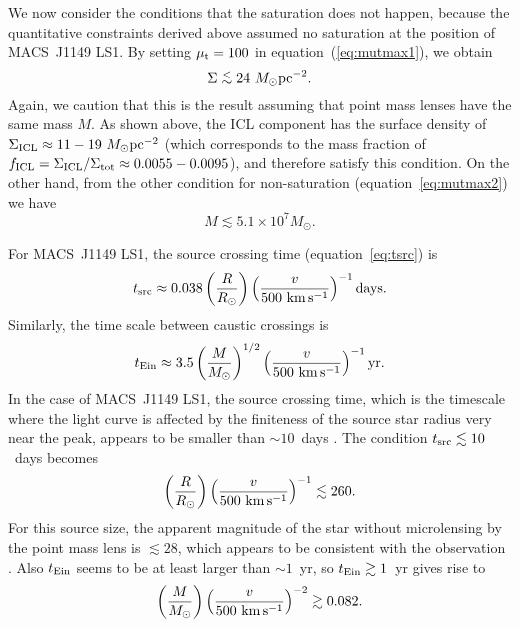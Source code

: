 \documentclass[showpacs,twocolumn,preprintnumbers,amsmath,amssymb,superscriptaddress,nofootinbib]{revtex4}
\newcommand{\simlt}{\lower.5ex\hbox{$\; \buildrel < \over \sim \;$}}
\begin{document}
We now consider the conditions that the saturation does not
happen, because the quantitative constraints derived above assumed
no saturation at the position of MACS~J1149 LS1. By setting $\mu_{\rm
  t}=100$ in equation~(\ref{eq:mutmax1}), we obtain
\begin{equation}
\Sigma\simlt 24~M_\odot{\rm pc}^{-2}.
\label{eq:const3}
\end{equation}
Again, we caution that this is the result assuming that point mass
lenses have the same mass $M$. As shown above, the ICL component has
the surface density of 
$\Sigma_{\rm ICL}\approx 11-19~M_\odot{\rm pc}^{-2}$ (which corresponds to
the mass fraction of $f_{\rm ICL}=\Sigma_{\rm ICL}/\Sigma_{\rm
  tot}\approx 0.0055-0.0095$), and therefore satisfy this
condition. On the other hand, from the other condition for
non-saturation (equation~\ref{eq:mutmax2}) we have
\begin{equation}
M\lesssim 5.1\times 10^7M_\odot.
\label{eq:const4}
\end{equation}

For MACS~J1149 LS1, the source crossing time (equation~\ref{eq:tsrc}) is
\begin{equation}
  t_{\rm src}\approx 0.038
  \left(\frac{R}{R_\odot}\right) \left(\frac{v}{500~{\rm
  km\,s^{-1}}}\right)^{-1}{\rm days}.
\end{equation}
Similarly, the time scale between caustic crossings is
\begin{equation}
  t_{\rm Ein}\approx
3.5\left(\frac{M}{M_\odot}\right)^{1/2}
\left(\frac{v}{500~{\rm km\,s^{-1}}}\right)^{-1} {\rm yr}.
\label{eq:tein2}
\end{equation}
In the case of MACS~J1149 LS1, the source crossing time, which is the
timescale where the light curve is affected by the finiteness of the
source star radius very near the peak, appears to be smaller than
$\sim 10$~days \cite{Kelly:2017fps}. The condition 
$t_{\rm src}\lesssim 10$~days becomes  
\begin{equation}
\left(\frac{R}{R_\odot}\right) \left(\frac{v}{500~{\rm
  km\,s^{-1}}}\right)^{-1}\lesssim 260.
\label{eq:const5}
\end{equation}
For this source size, the apparent magnitude of the star without
microlensing by the point mass lens is $\lesssim 28$, which appears to
be consistent with the observation \cite{Kelly:2017fps}.
Also $t_{\rm Ein}$ seems to be at least larger than $\sim 1$~yr, so
$t_{\rm Ein}\gtrsim 1$~yr gives rise to
\begin{equation}
  \left(\frac{M}{M_\odot}\right)\left(\frac{v}{500~{\rm
      km\,s^{-1}}}\right)^{-2}\gtrsim 0.082.
\label{eq:const6}
\end{equation}
\end{document}
